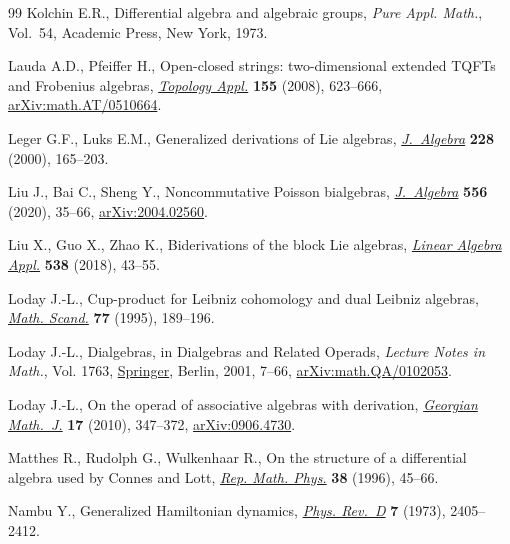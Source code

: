 \documentclass[10pt,a4paper]{amsart}
\numberwithin{equation}{section}
\begin{document}
\begin{thebibliography}{99}
Kolchin E.R., Differential algebra and algebraic groups, \textit{Pure Appl.
 Math.}, Vol.~54, Academic Press, New York, 1973.

Lauda A.D., Pfeiffer H., Open-closed strings: two-dimensional extended {TQFT}s
 and {F}robenius algebras, \href{https://doi.org/10.1016/j.topol.2007.11.005}{\textit{Topology Appl.}} \textbf{155} (2008),
 623--666, \href{https://arxiv.org/abs/math.AT/0510664}{arXiv:math.AT/0510664}.

Leger G.F., Luks E.M., Generalized derivations of {L}ie algebras,
 \href{https://doi.org/10.1006/jabr.1999.8250}{\textit{J.~Algebra}} \textbf{228} (2000), 165--203.

Liu J., Bai C., Sheng Y., Noncommutative {P}oisson bialgebras,
 \href{https://doi.org/10.1016/j.jalgebra.2020.03.009}{\textit{J.~Algebra}} \textbf{556} (2020), 35--66, \href{https://arxiv.org/abs/2004.02560}{arXiv:2004.02560}.

Liu X., Guo X., Zhao K., Biderivations of the block {L}ie algebras,
 \href{https://doi.org/10.1016/j.laa.2017.10.011}{\textit{Linear Algebra Appl.}} \textbf{538} (2018), 43--55.

Loday J.-L., Cup-product for {L}eibniz cohomology and dual {L}eibniz algebras,
 \href{https://doi.org/10.7146/math.scand.a-12560}{\textit{Math. Scand.}} \textbf{77} (1995), 189--196.

Loday J.-L., Dialgebras, in Dialgebras and Related Operads, \textit{Lecture
 Notes in Math.}, Vol. 1763, \href{https://doi.org/10.1007/3-540-45328-8_2}{Springer}, Berlin, 2001, 7--66,
 \href{https://arxiv.org/abs/math.QA/0102053}{arXiv:math.QA/0102053}.

Loday J.-L., On the operad of associative algebras with derivation,
 \href{https://doi.org/10.1515/gmj.2010.010}{\textit{Georgian Math.~J.}} \textbf{17} (2010), 347--372, \href{https://arxiv.org/abs/0906.4730}{arXiv:0906.4730}.

Matthes R., Rudolph G., Wulkenhaar R., On the structure of a differential
 algebra used by {C}onnes and {L}ott, \href{https://doi.org/10.1016/0034-4877(96)87677-4}{\textit{Rep. Math. Phys.}} \textbf{38}
 (1996), 45--66.

Nambu Y., Generalized {H}amiltonian dynamics, \href{https://doi.org/10.1103/PhysRevD.7.2405}{\textit{Phys. Rev.~D}} \textbf{7}
 (1973), 2405--2412.


\end{thebibliography}
\end{document}
